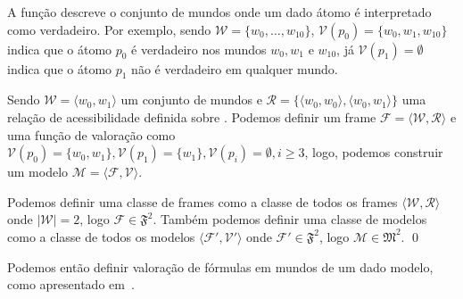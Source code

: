         A função  descreve o conjunto de mundos onde um dado átomo é interpretado como verdadeiro. Por exemplo,
        sendo \(\mathcal{W} = \{w_0, \dots, w_{10}\}\), \(\mathcal{V}(p_0) = \{w_0, w_1, w_{10}\}\) indica que o átomo \(p_0\) é verdadeiro
        nos mundos \(w_0, w_1 \text{ e } w_{10}\), já \(\mathcal{V}(p_1) = \emptyset\) indica que o átomo \(p_1\) não é verdadeiro em qualquer mundo.

        \begin{exemplo}
            \label{exe:FramesModelosClasses}
            Sendo \(\mathcal{W} = \langle w_0, w_1 \rangle\) um conjunto de mundos e \(\mathcal{R} = \{ \langle w_0, w_0 \rangle, \langle w_0, w_1 \rangle\}\)
            uma relação de acessibilidade definida sobre . Podemos definir um frame
            \(\mathcal{F} = \langle \mathcal{W}, \mathcal{R} \rangle\) e uma função de valoração  como
            \(\mathcal{V}(p_0) = \{w_0, w_1\}, \mathcal{V}(p_1) = \{w_1\}, \mathcal{V}(p_i) = \emptyset, i \geq 3 \), logo, podemos
            construir um modelo \(\mathcal{M} = \langle \mathcal{F}, \mathcal{V} \rangle\).

            Podemos definir uma classe de frames  como a classe de todos os frames \(\langle \mathcal{W}, \mathcal{R} \rangle\) onde
            \(|\mathcal{W}| = 2\), logo \(\mathcal{F} \in \mathfrak{F}^2\). Também podemos definir uma classe de modelos  como
            a classe de todos os modelos \(\langle \mathcal{F}', \mathcal{V}' \rangle\) onde \(\mathcal{F}' \in \mathfrak{F}^2\), logo
            \(\mathcal{M} \in \mathfrak{M}^2\). \qed
        \end{exemplo}

        Podemos então definir valoração de fórmulas em mundos de um dado modelo, como apresentado em~.

